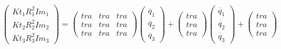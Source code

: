 \begin{equation}
	\begin{pmatrix}
	Kt_{1}R_{1}^{2}Im_{1} \\
	Kt_{2}R_{2}^{2}Im_{2} \\
	Kt_{3}R_{3}^{2}Im_{3}
	\end{pmatrix} =
	\begin{pmatrix}
	tra & tra & tra \\
	tra & tra & tra  \\
	tra & tra & tra
	\end{pmatrix}
	\begin{pmatrix}
	\ddot{q_{1}} \\
	\ddot{q_{2}}  \\
	\ddot{q_{3}}
	\end{pmatrix} +
	\begin{pmatrix}
	tra  \\
	tra   \\
	tra
	\end{pmatrix}
	\begin{pmatrix}
		\dot{q_{1}} \\
		\dot{q_{2}}  \\
		\dot{q_{3}}
	\end{pmatrix} +
\begin{pmatrix}
tra  \\
tra   \\
tra
\end{pmatrix}
\end{equation}


\newpage
